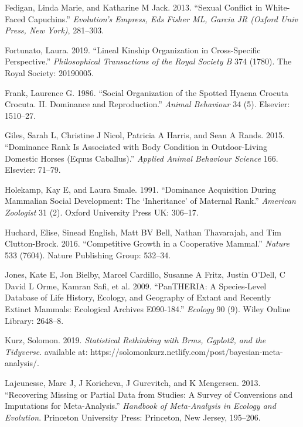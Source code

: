 \documentclass[]{article}
\begin{document}
\leavevmode\hypertarget{ref-fedigan2013sexual}{}%
Fedigan, Linda Marie, and Katharine M Jack. 2013. ``Sexual Conflict in
White-Faced Capuchins.'' \emph{Evolution's Empress, Eds Fisher ML,
Garcia JR (Oxford Univ Press, New York)}, 281--303.

\leavevmode\hypertarget{ref-fortunato2019lineal}{}%
Fortunato, Laura. 2019. ``Lineal Kinship Organization in Cross-Specific
Perspective.'' \emph{Philosophical Transactions of the Royal Society B}
374 (1780). The Royal Society: 20190005.

\leavevmode\hypertarget{ref-frank1986social}{}%
Frank, Laurence G. 1986. ``Social Organization of the Spotted Hyaena
Crocuta Crocuta. II. Dominance and Reproduction.'' \emph{Animal
Behaviour} 34 (5). Elsevier: 1510--27.

\leavevmode\hypertarget{ref-giles2015dominance}{}%
Giles, Sarah L, Christine J Nicol, Patricia A Harris, and Sean A Rands.
2015. ``Dominance Rank Is Associated with Body Condition in
Outdoor-Living Domestic Horses (Equus Caballus).'' \emph{Applied Animal
Behaviour Science} 166. Elsevier: 71--79.

\leavevmode\hypertarget{ref-holekamp1991dominance}{}%
Holekamp, Kay E, and Laura Smale. 1991. ``Dominance Acquisition During
Mammalian Social Development: The `Inheritance' of Maternal Rank.''
\emph{American Zoologist} 31 (2). Oxford University Press UK: 306--17.

\leavevmode\hypertarget{ref-huchard2016competitive}{}%
Huchard, Elise, Sinead English, Matt BV Bell, Nathan Thavarajah, and Tim
Clutton-Brock. 2016. ``Competitive Growth in a Cooperative Mammal.''
\emph{Nature} 533 (7604). Nature Publishing Group: 532--34.

\leavevmode\hypertarget{ref-jones2009pantheria}{}%
Jones, Kate E, Jon Bielby, Marcel Cardillo, Susanne A Fritz, Justin
O'Dell, C David L Orme, Kamran Safi, et al. 2009. ``PanTHERIA: A
Species-Level Database of Life History, Ecology, and Geography of Extant
and Recently Extinct Mammals: Ecological Archives E090-184.''
\emph{Ecology} 90 (9). Wiley Online Library: 2648--8.

\leavevmode\hypertarget{ref-kurz2019rethinking}{}%
Kurz, Solomon. 2019. \emph{Statistical Rethinking with Brms, Ggplot2,
and the Tidyverse}. available at:
https://solomonkurz.netlify.com/post/bayesian-meta-analysis/.

\leavevmode\hypertarget{ref-lajeunesse2013recovering}{}%
Lajeunesse, Marc J, J Koricheva, J Gurevitch, and K Mengersen. 2013.
``Recovering Missing or Partial Data from Studies: A Survey of
Conversions and Imputations for Meta-Analysis.'' \emph{Handbook of
Meta-Analysis in Ecology and Evolution}. Princeton University Press:
Princeton, New Jersey, 195--206.
\end{document}
